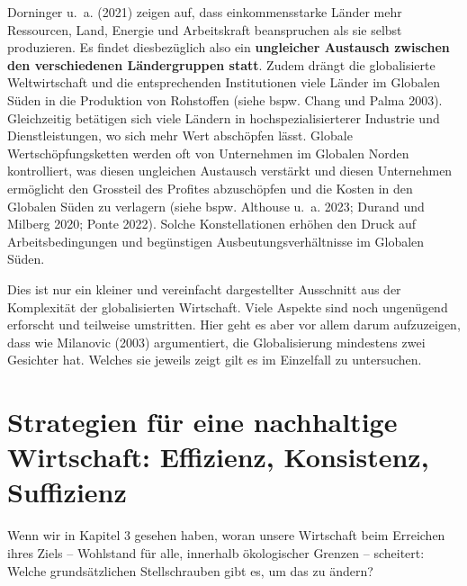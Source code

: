 \documentclass[
  nswissgerman,
  a4paper,
  DIV=11,
  numbers=noendperiod,
  oneside,
  openany]{scrreprt}
\begin{document}
Dorninger u.~a. (2021) zeigen auf, dass einkommensstarke Länder mehr
Ressourcen, Land, Energie und Arbeitskraft beanspruchen als sie selbst
produzieren. Es findet diesbezüglich also ein \textbf{ungleicher
Austausch zwischen den verschiedenen Ländergruppen statt}. Zudem drängt
die globalisierte Weltwirtschaft und die entsprechenden Institutionen
viele Länder im Globalen Süden in die Produktion von Rohstoffen (siehe
bspw. Chang und Palma 2003). Gleichzeitig betätigen sich viele Ländern
in hochspezialisierterer Industrie und Dienstleistungen, wo sich mehr
Wert abschöpfen lässt. Globale Wertschöpfungsketten werden oft von
Unternehmen im Globalen Norden kontrolliert, was diesen ungleichen
Austausch verstärkt und diesen Unternehmen ermöglicht den Grossteil des
Profites abzuschöpfen und die Kosten in den Globalen Süden zu verlagern
(siehe bspw. Althouse u.~a. 2023; Durand und Milberg 2020; Ponte 2022).
Solche Konstellationen erhöhen den Druck auf Arbeitsbedingungen und
begünstigen Ausbeutungsverhältnisse im Globalen Süden.

Dies ist nur ein kleiner und vereinfacht dargestellter Ausschnitt aus
der Komplexität der globalisierten Wirtschaft. Viele Aspekte sind noch
ungenügend erforscht und teilweise umstritten. Hier geht es aber vor
allem darum aufzuzeigen, dass wie Milanovic (2003) argumentiert, die
Globalisierung mindestens zwei Gesichter hat. Welches sie jeweils zeigt
gilt es im Einzelfall zu untersuchen.

\chapter{Strategien für eine nachhaltige Wirtschaft: Effizienz,
Konsistenz,
Suffizienz}\label{strategien-fuxfcr-eine-nachhaltige-wirtschaft-effizienz-konsistenz-suffizienz}

\begin{tcolorbox}[enhanced jigsaw, arc=.35mm, bottomrule=.15mm, bottomtitle=1mm, breakable, colback=white, colbacktitle=quarto-callout-note-color!10!white, colframe=quarto-callout-note-color-frame, coltitle=black, left=2mm, leftrule=.75mm, opacityback=0, opacitybacktitle=0.6, rightrule=.15mm, title={Leitfrage}, titlerule=0mm, toprule=.15mm, toptitle=1mm]

Wenn wir in Kapitel 3 gesehen haben, woran unsere Wirtschaft beim
Erreichen ihres Ziels -- Wohlstand für alle, innerhalb ökologischer
Grenzen -- scheitert: Welche grundsätzlichen Stellschrauben gibt es, um
das zu ändern?

\end{tcolorbox}
\end{document}
